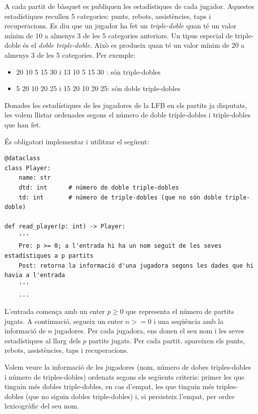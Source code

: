 

\Statement

A cada partit de bàsquet es publiquen les estadístiques de cada jugador. Aquestes estadístiques recullen 5 categories: punts, rebots, assistències, taps i recuperacions. Es diu que un jugador ha fet un \emph{triple-doble} quan té un valor mínim de 10 a almenys 3 de les 5 categories anteriors. Un tipus especial de triple-doble és el \emph{doble triple-doble}. Això es produeix quan té un valor mínim de 20 a almenys 3 de les 5 categories. Per exemple:

\begin{itemize}
\item 20 10 5 15 30 i 13 10 5 15 30 : són triple-dobles
\item 5 20 10 20 25 i 15 20 10 20 25: són doble triple-dobles
\end{itemize}

Donades les estadístiques de les jugadores de la LFB en els partits ja disputats, les volem llistar ordenades segons el número de doble triple-dobles i triple-dobles que han fet.

És obligatori implementar i utilitzar el següent:

\begin{verbatim}
@dataclass
class Player:
    name: str
    dtd: int      # número de doble triple-dobles
    td: int       # número de triple-dobles (que no són doble triple-doble)

def read_player(p: int) -> Player:
    '''
    Pre: p >= 0; a l'entrada hi ha un nom seguit de les seves estadístiques a p partits
    Post: retorna la informació d'una jugadora segons les dades que hi havia a l'entrada
    '''
    ...

\end{verbatim}

\Input

L'entrada comença amb un enter $p \ge 0$ que representa el número de partits jugats. A continuació, segueix un enter $n >= 0$ i una seqüència amb la informació de $n$ jugadores. Per cada jugadora, ens donen el seu nom i les seves estadístiques al llarg dels $p$ partits jugats. Per cada partit, apareixen els punts, rebots, assistències, taps i recuperacions.

\Output

Volem veure la informació de les jugadores (nom, número de dobes triples-dobles i número de triples-dobles) ordenats segons els següents criteris: primer les que tinguin més dobles triple-dobles, en cas d'empat, les que tinguin més triples-dobles (que no siguin dobles triple-dobles) i, si persisteix l'empat, per ordre lexicogràfic del seu nom.


\Sample




